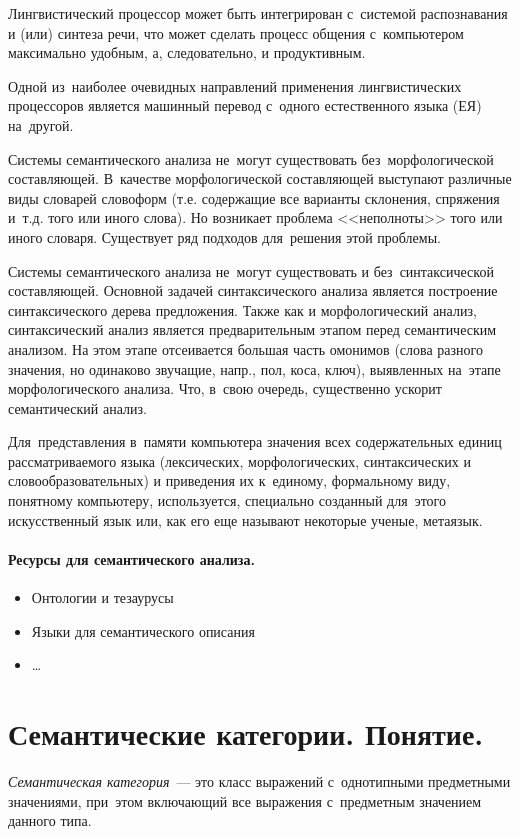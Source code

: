 \documentclass[12pt]{article}
\theoremstyle{definition}
\theoremstyle{remark}
\numberwithin{equation}{section}
\begin{document}
Лингвистический процессор может быть интегрирован с~системой распознавания
и (или) синтеза речи, что может сделать процесс общения с~компьютером
максимально удобным, а, следовательно, и продуктивным.

Одной из~наиболее очевидных направлений применения лингвистических
процессоров является машинный перевод с~одного естественного языка (ЕЯ)
на~другой.

Системы семантического анализа не~могут существовать без~морфологической
составляющей. В~качестве морфологической составляющей выступают различные
виды словарей словоформ (т.е. содержащие все варианты склонения, спряжения
и~т.д. того или иного слова). Но возникает проблема <<неполноты>> того или
иного словаря. Существует ряд подходов для~решения этой проблемы.

Системы семантического анализа не~могут существовать и без~синтаксической
составляющей. Основной задачей синтаксического анализа является построение
синтаксического дерева предложения. Также как и морфологический анализ,
синтаксический анализ является предварительным этапом перед семантическим
анализом. На этом этапе отсеивается большая часть омонимов (слова разного
значения, но одинаково звучащие, напр., пол, коса, ключ), выявленных на~этапе
морфологического анализа. Что, в~свою очередь, существенно ускорит
семантический анализ.

Для~представления в~памяти компьютера значения всех содержательных единиц
рассматриваемого языка (лексических, морфологических, синтаксических и
словообразовательных) и приведения их к~единому, формальному виду,
понятному компьютеру, используется, специально созданный для~этого
искусственный язык или, как его еще называют некоторые ученые, метаязык.

\paragraph{Ресурсы для семантического анализа.}
\begin{itemize}
	\item Онтологии и тезаурусы
	\item Языки для семантического описания
	\item \dots
\end{itemize}

\section{Семантические категории. Понятие.}
{\sl Семантическая категория}~--- это класс выражений с~однотипными
предметными значениями, при~этом включающий все выражения с~предметным
значением данного типа.
\end{document}
